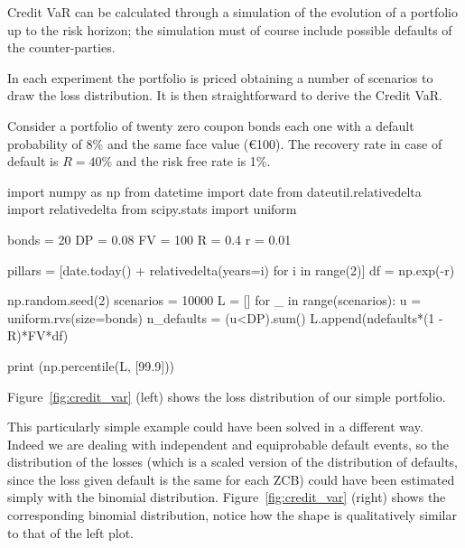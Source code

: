 Credit VaR can be calculated through a simulation of the evolution of a portfolio up to the risk horizon; the simulation must of course include possible defaults of the counter-parties. 

In each experiment the portfolio is priced obtaining a number of scenarios to draw the loss distribution. It is then straightforward to derive the Credit VaR.

Consider a portfolio of twenty zero coupon bonds each one with a default probability of 8\% and the same face value (\euro{100}). The recovery rate in case of default is $R=40\%$ and the risk free rate is 1\%.

\begin{ipython}
import numpy as np
from datetime import date
from dateutil.relativedelta import relativedelta
from scipy.stats import uniform

bonds = 20
DP = 0.08
FV = 100
R = 0.4
r = 0.01

pillars = [date.today() + relativedelta(years=i) for i in range(2)]
df = np.exp(-r)

np.random.seed(2)
scenarios = 10000
L = []
for _ in range(scenarios):
    u = uniform.rvs(size=bonds)
    n_defaults = (u<DP).sum()
    L.append(ndefaults*(1 - R)*FV*df)

print (np.percentile(L, [99.9]))
\end{ipython}
\begin{ioutput}
[356.41794015]
\end{ioutput}
\noindent
Figure~\ref{fig:credit_var} (left) shows the loss distribution of our simple portfolio.

This particularly simple example could have been solved in a different way. Indeed we are dealing with independent and equiprobable default events, so the distribution of the losses (which is a scaled version of the distribution of defaults, since the loss given default is the same for each ZCB) could have been estimated simply with the binomial distribution. Figure~\ref{fig:credit_var} (right) shows the corresponding binomial distribution, notice how the shape is qualitatively similar to that of the left plot.

